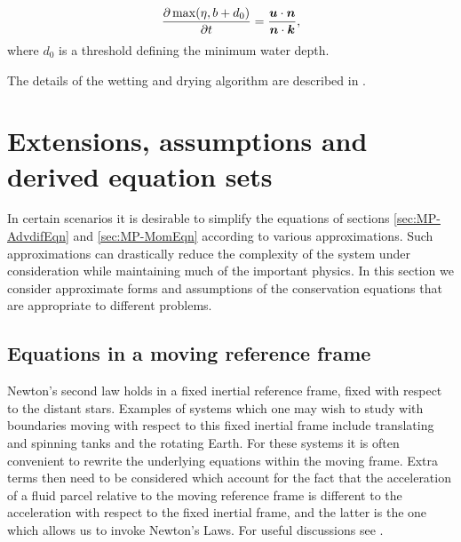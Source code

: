 \begin{equation}\label{eq:wd1}
\frac{\partial \max(\eta, b+d_0)}{\partial t}=\frac{{\mbox{\boldmath$u$}} \cdot {\mbox{\boldmath$n$}}}{{\mbox{\boldmath$n$}} \cdot {\mbox{\boldmath$k$}}},
\end{equation}
where $d_0$ is a threshold defining the minimum water depth.

The details of the wetting and drying algorithm are described in \cite{Funke2011}.

\section{Extensions, assumptions and derived equation sets}\label{sec:eqn_extensions}

In certain scenarios it is desirable to simplify the equations of sections \ref{sec:MP-AdvdifEqn} and \ref {sec:MP-MomEqn} according to various approximations. Such approximations can drastically reduce the complexity of the system under consideration while maintaining much of the important physics. In this section we consider approximate forms and assumptions of the conservation equations that are appropriate to different problems. 

\subsection{Equations in a moving reference frame}\label{sec:coriolis}
Newton's second law holds in a fixed inertial reference frame, \ie
fixed with respect to the distant stars. 
Examples of systems which one may wish to study with boundaries moving
with respect to this fixed inertial frame include translating and spinning tanks
and the rotating Earth. For these systems it is often convenient to rewrite the 
underlying equations within the moving frame. Extra terms then need to be considered 
which account for the fact that the acceleration of a fluid parcel relative to the 
moving reference frame is different to the acceleration with respect to the fixed 
inertial frame, and the latter is the one which allows us to invoke Newton's Laws.
For useful discussions see \citep{batchelor1967,cushman1994,gill1982}.

